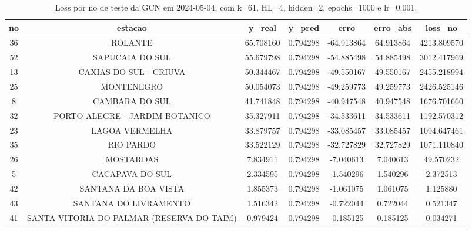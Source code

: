 \begin{table}[h]
\centering
\caption{Loss por no de teste da GCN em 2024-05-04, com k=61, HL=4, hidden=2, epochs=1000 e lr=0.001.}
\label{tab:gcn_loss_k61_hl4_h2_e1000_d20240504}
\begin{tabular}{ccccccc}
\toprule
no & estacao & y\_real & y\_pred & erro & erro\_abs & loss\_no \\
\midrule
36 & ROLANTE & 65.708160 & 0.794298 & -64.913864 & 64.913864 & 4213.809570 \\
52 & SAPUCAIA DO SUL & 55.679798 & 0.794298 & -54.885498 & 54.885498 & 3012.417969 \\
13 & CAXIAS DO SUL - CRIUVA & 50.344467 & 0.794298 & -49.550167 & 49.550167 & 2455.218994 \\
25 & MONTENEGRO & 50.054073 & 0.794298 & -49.259773 & 49.259773 & 2426.525146 \\
8 & CAMBARA DO SUL & 41.741848 & 0.794298 & -40.947548 & 40.947548 & 1676.701660 \\
32 & PORTO ALEGRE - JARDIM BOTANICO & 35.327911 & 0.794298 & -34.533611 & 34.533611 & 1192.570312 \\
23 & LAGOA VERMELHA & 33.879757 & 0.794298 & -33.085457 & 33.085457 & 1094.647461 \\
35 & RIO PARDO & 33.522129 & 0.794298 & -32.727829 & 32.727829 & 1071.110840 \\
26 & MOSTARDAS & 7.834911 & 0.794298 & -7.040613 & 7.040613 & 49.570232 \\
5 & CACAPAVA DO SUL & 2.334595 & 0.794298 & -1.540296 & 1.540296 & 2.372513 \\
42 & SANTANA DA BOA VISTA & 1.855373 & 0.794298 & -1.061075 & 1.061075 & 1.125880 \\
43 & SANTANA DO LIVRAMENTO & 1.516342 & 0.794298 & -0.722044 & 0.722044 & 0.521347 \\
41 & SANTA VITORIA DO PALMAR (RESERVA DO TAIM) & 0.979424 & 0.794298 & -0.185125 & 0.185125 & 0.034271 \\
\bottomrule
\end{tabular}
\end{table}
